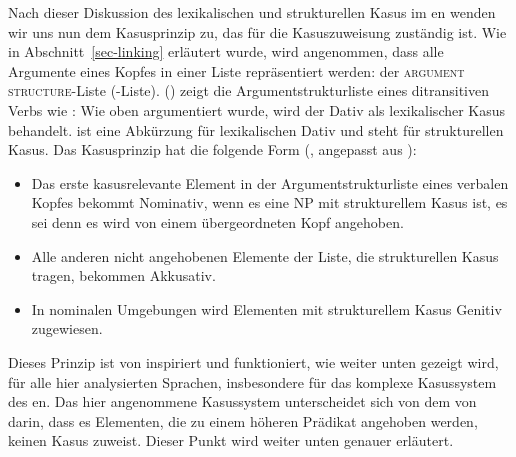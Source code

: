 
Nach dieser Diskussion des lexikalischen und strukturellen Kasus im en wenden wir uns nun dem Kasusprinzip zu,
das für die Kasuszuweisung zuständig ist. Wie in Abschnitt~\ref{sec-linking} erläutert wurde, wird angenommen, dass alle Argumente eines
Kopfes in einer Liste repräsentiert werden: der \textsc{argument structure}-Liste (\argst-Liste).
() zeigt die Argumentstrukturliste eines ditransitiven Verbs wie :
\ea
{}
\z
Wie oben argumentiert wurde, wird der Dativ als lexikalischer Kasus behandelt.  ist eine Abkürzung für lexikalischen
Dativ und  steht für strukturellen Kasus. Das Kasusprinzip
hat die folgende Form (\citealp[332]{MuellerLehrbuch4}, angepasst aus \citealp{Prze99,Meurers99b}):

\begin{principle-break}
\label{case-p}
\begin{itemize}
\item Das erste kasusrelevante Element in der Argumentstrukturliste eines verbalen Kopfes bekommt
  Nominativ, wenn es eine NP mit strukturellem Kasus ist, es sei denn es wird von einem übergeordneten Kopf angehoben. 
\item Alle anderen nicht angehobenen Elemente der Liste, die strukturellen Kasus tragen, bekommen Akkusativ.
\item In nominalen Umgebungen wird Elementen mit strukturellem Kasus Genitiv zugewiesen.
\end{itemize}
\end{principle-break}
Dieses Prinzip ist von \citet*{YMJ87} inspiriert und funktioniert, wie weiter unten gezeigt wird, für alle
hier analysierten Sprachen, insbesondere für das komplexe Kasussystem des en. Das hier angenommene Kasussystem
unterscheidet sich von dem von \citeauthor*{YMJ87} darin, dass es Elementen, die zu einem höheren Prädikat angehoben werden, keinen Kasus zuweist. Dieser Punkt wird weiter unten genauer erläutert.

